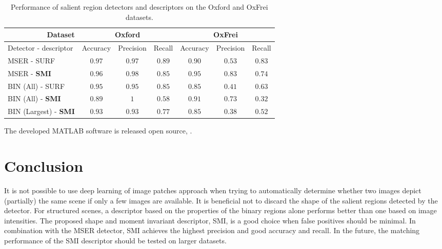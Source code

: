 \documentclass[a4paper,11pt]{article}
\begin{document}
\begin{table}[!ht]
\begin{center}
  \vspace{-4pt}
\begin{tabular}{|l|*{6}{c|}}  %
\hline
\multicolumn{1}{|r}{Dataset} & \multicolumn{3}{|c|}{Oxford}  & \multicolumn{3}{|c|}{OxFrei} \\ \hline
{Detector - descriptor}  & Accuracy      & Precision   &  Recall       & Accuracy        & Precision & Recall \\ \hline
MSER - SURF              & {\boldmath $0.97$} & $0.97$     & {\boldmath $0.89$} &  $0.90$         & $0.53$    & {\boldmath $0.83$}\\ \hline
MSER - \bf{SMI}          & {\boldmath $0.96$}       & {\boldmath $0.98$}&  {\boldmath$0.85$}       & {\boldmath $0.95$}    &{\boldmath $0.83$} &  {\boldmath$0.74$} \\ \hline
BIN (All) - SURF         & $0.95$       & $0.95$     &$0.85$        & $0.85$          & $0.41$    & $0.63$\\ \hline
BIN (All) - \bf{SMI}     & $0.89$        & {\boldmath $1$}   &$0.58$         & $0.91$          & $0.73$    & $0.32$\\ \hline
BIN (Largest) - \bf{SMI} & $0.93$        & $0.93$      &$0.77$         & $0.85$          & $0.38$    & $0.52$\\ \hline
\end{tabular}
\end{center}
\vspace{-18pt}
\caption{\small Performance of salient region detectors and descriptors on the Oxford and OxFrei datasets.} \label{tab:perf}
  \vspace{-10pt}
\end{table}

The developed MATLAB software is released open source, \cite{mycode}.
 \vspace{-10pt}
\section{Conclusion}
It is not possible to use deep learning of image patches approach when trying to automatically determine whether two images depict (partially) the same scene if only a few images are available. It is beneficial not to discard the shape of the salient regions detected by the detector. For structured scenes, a descriptor based on the properties of the binary regions alone performs better than one based on image intensities.  The proposed shape and moment invariant descriptor, SMI, is a good choice when false positives should be minimal. In combination with the MSER detector, SMI achieves the highest precision and good accuracy and recall. In the future, the matching performance of the SMI descriptor should be tested on larger datasets.
\end{document}
